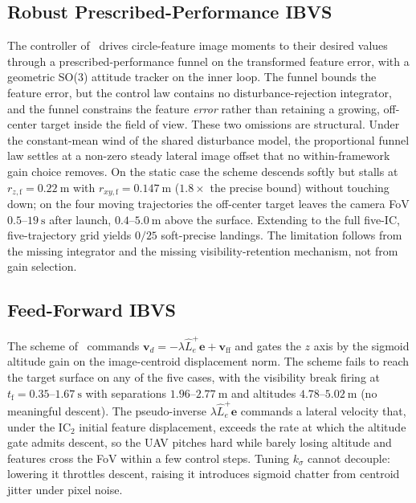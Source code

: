 \documentclass{IEEEtaes}
\begin{document}
\subsection{Robust Prescribed-Performance IBVS \cite{lin2023}}
The controller of~\cite{lin2023} drives circle-feature image moments to their desired values through a prescribed-performance funnel on the transformed feature error, with a geometric SO(3) attitude tracker on the inner loop. The funnel bounds the feature error, but the control law contains no disturbance-rejection integrator, and the funnel constrains the feature \emph{error} rather than retaining a growing, off-center target inside the field of view. These two omissions are structural. Under the constant-mean wind of the shared disturbance model, the proportional funnel law settles at a non-zero steady lateral image offset that no within-framework gain choice removes. On the static case the scheme descends softly but stalls at $r_{z,\text{f}}=0.22~\text{m}$ with $r_{xy,\text{f}}=0.147~\text{m}$ ($1.8\times$ the precise bound) without touching down; on the four moving trajectories the off-center target leaves the camera FoV $0.5$--$19~\text{s}$ after launch, $0.4$--$5.0~\text{m}$ above the surface. Extending to the full five-IC, five-trajectory grid yields $0/25$ soft-precise landings. The limitation follows from the missing integrator and the missing visibility-retention mechanism, not from gain selection.

\subsection{Feed-Forward IBVS \cite{cho2022}}
The scheme of~\cite{cho2022} commands $\boldsymbol{v}_d=-\lambda\hat{L}_e^+\boldsymbol{e}+\boldsymbol{v}_{\text{ff}}$ and gates the $z$ axis by the sigmoid altitude gain on the image-centroid displacement norm. The scheme fails to reach the target surface on any of the five cases, with the visibility break firing at $t_\text{f}=0.35$--$1.67~\text{s}$ with separations $1.96$--$2.77~\text{m}$ and altitudes $4.78$--$5.02~\text{m}$ (no meaningful descent). The pseudo-inverse $\lambda\hat{L}_e^+\boldsymbol{e}$ commands a lateral velocity that, under the IC$_2$ initial feature displacement, exceeds the rate at which the altitude gate admits descent, so the UAV pitches hard while barely losing altitude and features cross the FoV within a few control steps. Tuning $k_\sigma$ cannot decouple: lowering it throttles descent, raising it introduces sigmoid chatter from centroid jitter under pixel noise.
\end{document}

